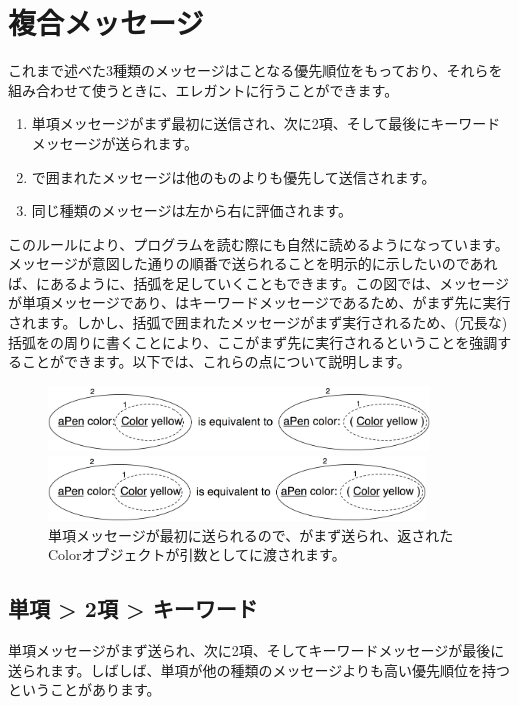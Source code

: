 \documentclass[a4paper,10pt,twoside]{book}
\begin{document}
\section{複合メッセージ}
これまで述べた3種類のメッセージはことなる優先順位をもっており、それらを組み合わせて使うときに、エレガントに行うことができます。

\begin{enumerate}
\item 単項メッセージがまず最初に送信され、次に2項、そして最後にキーワードメッセージが送られます。
\item {}で囲まれたメッセージは他のものよりも優先して送信されます。
\item 同じ種類のメッセージは左から右に評価されます。
\end{enumerate}

このルールにより、プログラムを読む際にも自然に読めるようになっています。メッセージが意図した通りの順番で送られることを明示的に示したいのであれば、にあるように、括弧を足していくこともできます。この図では、メッセージが単項メッセージであり、はキーワードメッセージであるため、がまず先に実行されます。しかし、括弧で囲まれたメッセージがまず実行されるため、(冗長な)括弧をの周りに書くことにより、ここがまず先に実行されるということを強調することができます。以下では、これらの点について説明します。

\begin{figure}[ht]
\ifluluelse
	{\centerline{\includegraphics[width=0.9\textwidth]{uKeyUn}} }
	{\centerline{\includegraphics[width=10cm]{uKeyUn}} }
\caption{単項メッセージが最初に送られるので、がまず送られ、返されたColorオブジェクトが引数としてに渡されます。}
\end{figure}

\subsection*{単項 > 2項 > キーワード}
単項メッセージがまず送られ、次に2項、そしてキーワードメッセージが最後に送られます。しばしば、単項が他の種類のメッセージよりも高い優先順位を持つということがあります。
\end{document}
